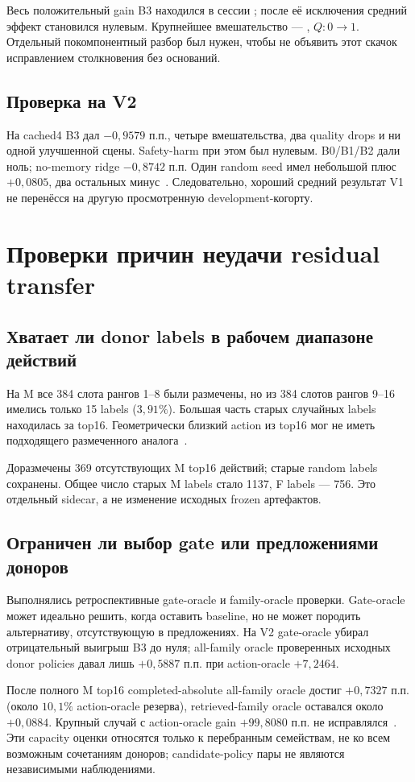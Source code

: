 \documentclass[11pt,a4paper]{article}
\newcommand{\code}[1]{\texttt{\detokenize{#1}}}
\begin{document}
Весь положительный gain B3 находился в сессии \code{2021.10.11.07.47.13_veh-50}; после её исключения средний эффект становился нулевым. Крупнейшее вмешательство --- \code{f27a618a5c7458ee}, $Q:0\rightarrow1$. Отдельный покомпонентный разбор был нужен, чтобы не объявить этот скачок исправлением столкновения без оснований.

\subsection{Проверка на V2}
На cached4 B3 дал $-0{,}9579$ п.п., четыре вмешательства, два quality drops и ни одной улучшенной сцены. Safety-harm при этом был нулевым. B0/B1/B2 дали ноль; no-memory ridge $-0{,}8742$ п.п. Один random seed имел небольшой плюс $+0{,}0805$, два остальных минус~\cite{cached}. Следовательно, хороший средний результат V1 не перенёсся на другую просмотренную development-когорту.

\section{Проверки причин неудачи residual transfer}
\subsection{Хватает ли donor labels в рабочем диапазоне действий}
На M все 384 слота рангов 1--8 были размечены, но из 384 слотов рангов 9--16 имелись только 15 labels ($3{,}91\%$). Большая часть старых случайных labels находилась за top16. Геометрически близкий action из top16 мог не иметь подходящего размеченного аналога~\cite{support}.

Доразмечены 369 отсутствующих M top16 действий; старые random labels сохранены. Общее число старых M labels стало 1137, F labels --- 756. Это отдельный sidecar, а не изменение исходных frozen артефактов.

\subsection{Ограничен ли выбор gate или предложениями доноров}
Выполнялись ретроспективные gate-oracle и family-oracle проверки. Gate-oracle может идеально решить, когда оставить baseline, но не может породить альтернативу, отсутствующую в предложениях. На V2 gate-oracle убирал отрицательный выигрыш B3 до нуля; all-family oracle проверенных исходных donor policies давал лишь $+0{,}5887$ п.п. при action-oracle $+7{,}2464$.

После полного M top16 completed-absolute all-family oracle достиг $+0{,}7327$ п.п. (около $10{,}1\%$ action-oracle резерва), retrieved-family oracle оставался около $+0{,}0884$. Крупный случай с action-oracle gain $+99{,}8080$ п.п. не исправлялся~\cite{capacity}. Эти capacity оценки относятся только к перебранным семействам, не ко всем возможным сочетаниям доноров; candidate-policy пары не являются независимыми наблюдениями.
\end{document}
